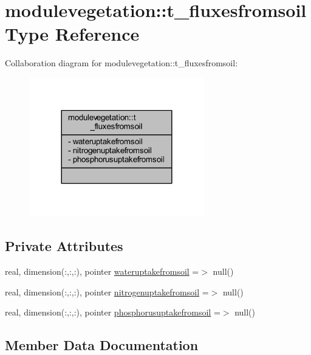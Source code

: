 \hypertarget{structmodulevegetation_1_1t__fluxesfromsoil}{}\section{modulevegetation\+:\+:t\+\_\+fluxesfromsoil Type Reference}
\label{structmodulevegetation_1_1t__fluxesfromsoil}


Collaboration diagram for modulevegetation\+:\+:t\+\_\+fluxesfromsoil\+:\nopagebreak
\begin{figure}[H]
\begin{center}
\leavevmode
\includegraphics[width=216pt]{structmodulevegetation_1_1t__fluxesfromsoil__coll__graph}
\end{center}
\end{figure}
\subsection*{Private Attributes}
\begin{DoxyCompactItemize}
\item 
real, dimension(\+:,\+:,\+:), pointer \mbox{\hyperlink{structmodulevegetation_1_1t__fluxesfromsoil_a7c36e9cb31d8bf7ef7be9c4106e4e4ce}{wateruptakefromsoil}} =$>$ null()
\item 
real, dimension(\+:,\+:,\+:), pointer \mbox{\hyperlink{structmodulevegetation_1_1t__fluxesfromsoil_a8a0f6757d8025ddec4bbb557ba9c99b9}{nitrogenuptakefromsoil}} =$>$ null()
\item 
real, dimension(\+:,\+:,\+:), pointer \mbox{\hyperlink{structmodulevegetation_1_1t__fluxesfromsoil_a49b395bebfb73adf315c1d160be0ac0e}{phosphorusuptakefromsoil}} =$>$ null()
\end{DoxyCompactItemize}


\subsection{Member Data Documentation}
\mbox{\label{structmodulevegetation_1_1t__fluxesfromsoil_a8a0f6757d8025ddec4bbb557ba9c99b9}} 
